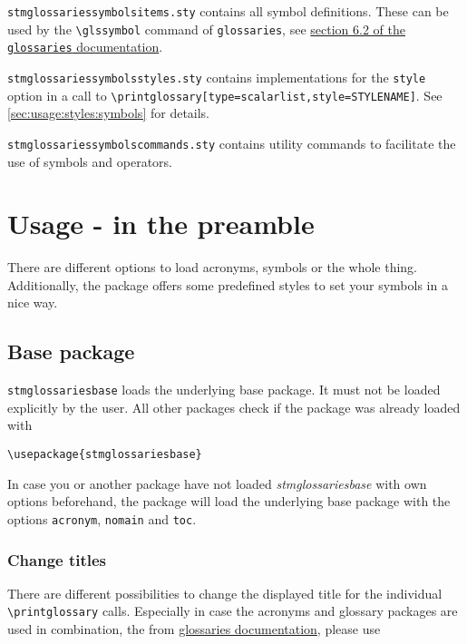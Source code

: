 \documentclass[%
  type=article,%
  layout=koma,%
  hyperref=true,%
  conditionallox=true,%
  conditionalloxnewpage=false,%
  date=true,%
  index=true,%
  listings=true%
]{stmtext}
\begin{document}
\texttt{stmglossariessymbolsitems.sty} contains all symbol definitions. These can be used by the \texttt{\textbackslash glssymbol} command of \texttt{glossaries}, see \href{http://ftp.fau.de/ctan/macros/latex/contrib/glossaries/glossaries-user.pdf#section.6.2}{section 6.2 of the \texttt{glossaries} documentation}.

\texttt{stmglossariessymbolsstyles.sty} contains implementations for the \texttt{style} option in a call to \verb+\printglossary[type=scalarlist,style=STYLENAME]+. See \autoref{sec:usage:styles:symbols} for details.

\texttt{stmglossariessymbolscommands.sty} contains utility commands to facilitate the use of symbols and operators.

\section{Usage - in the preamble}
\label{sec:usage:preamble}

There are different options to load acronyms, symbols or the whole thing. Additionally, the package offers some predefined styles to set your symbols in a nice way.

\subsection{Base package}
\label{sec:usage:preamble:base}

\texttt{stmglossariesbase} loads the underlying base package. It must not be loaded explicitly by the user. All other packages check if the package was already loaded with

\begin{verbatim}
\usepackage{stmglossariesbase}
\end{verbatim}

In case you or another package have not loaded \textit{stmglossariesbase} with own options beforehand, the package will load the underlying base package with the options \texttt{acronym}, \texttt{nomain} and \texttt{toc}.

\subsubsection{Change titles}

There are different possibilities to change the displayed title for the individual \texttt{\textbackslash printglossary} calls. Especially in case the acronyms and glossary packages are used in combination, the from \href{http://ctan.space-pro.be/tex-archive/macros/latex/contrib/glossaries/glossaries-user.html#sec:fixednames}{glossaries documentation}, please use
\end{document}
